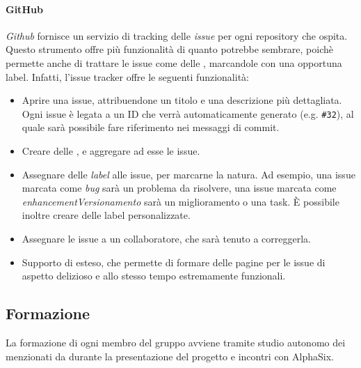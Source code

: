     		\paragraph{GitHub}
			\emph{Github} fornisce un servizio di tracking delle \emph{issue} per ogni repository che ospita. Questo strumento offre più funzionalità di quanto potrebbe
			sembrare, poichè permette anche di trattare le issue come delle , marcandole con una opportuna label. Infatti, l'issue tracker offre le seguenti 
			funzionalità:
			\begin{itemize}
				\item Aprire una issue, attribuendone un titolo e una descrizione più dettagliata. Ogni issue è legata a un ID che verrà automaticamente generato (e.g. \texttt{\#32}),
					al quale sarà possibile fare riferimento nei messaggi di commit.
				\item Creare delle , e aggregare ad esse le issue.
				\item Assegnare delle \emph{label} alle issue, per marcarne la natura. Ad esempio, una issue marcata come \emph{bug} sarà un problema da risolvere,
					una issue marcata come \emph{enhancementVersionamento} sarà un miglioramento o una task. È possibile inoltre creare delle label personalizzate.
				\item Assegnare le issue a un collaboratore, che sarà tenuto a correggerla.
				\item Supporto di  esteso, che permette di formare delle pagine per le issue di aspetto delizioso e allo stesso tempo estremamente funzionali.
			\end{itemize}
    		

			
	
	\subsection{Formazione}		
	
		La formazione di ogni membro del gruppo avviene tramite studio autonomo dei  menzionati da \II durante la presentazione del progetto e incontri con AlphaSix.
		
